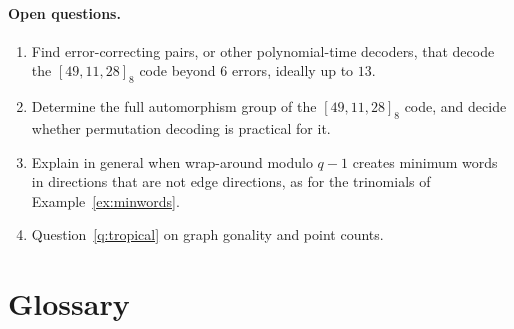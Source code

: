 \documentclass[12pt,letterpaper]{article}
\numberwithin{equation}{section}
\theoremstyle{definition}
\theoremstyle{remark}
\begin{document}
\paragraph{Open questions.}
\begin{enumerate}[leftmargin=*]
\item Find error-correcting pairs, or other polynomial-time decoders, that
decode the $[49,11,28]_8$ code beyond $6$ errors, ideally up to $13$.
\item Determine the full automorphism group of the $[49,11,28]_8$ code, and
decide whether permutation decoding is practical for it.
\item Explain in general when wrap-around modulo $q-1$ creates minimum words
in directions that are not edge directions, as for the trinomials of
Example~\ref{ex:minwords}.
\item Question~\ref{q:tropical} on graph gonality and point counts.
\end{enumerate}

\section{Glossary}\label{sec:glossary}
\end{document}
